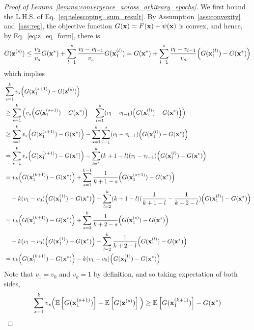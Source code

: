 \begin{proof}[Proof of Lemma~\ref{lemma:convergence_across_arbitrary_epochs}]
    We first bound the L.H.S. of Eq.~\ref{eq:telescoping_sum_result}.
    By Assumption~\ref{ass:convexity} and~\ref{ass:reg}, the objective function $G({\mathbf{x}}) = F({\mathbf{x}}) + \psi({\mathbf{x}})$ is convex, and hence, by Eq.~\ref{eq:z_eq_form}, there is
    \begin{align}
        G({\mathbf{z}}^{(s)}) \leq \frac{v_0}{v_s} G({\mathbf{x}}^*) + \sum_{l=1}^{s}\frac{v_l - v_{l-1}}{v_s} G({\mathbf{x}}_1^{(l)})
        = G({\mathbf{x}}^*) + \sum_{l=1}^{s}\frac{v_l - v_{l-1}}{v_s} \Big( G({\mathbf{x}}_1^{(l)}) - G({\mathbf{x}}^*)\Big)
    \end{align}
    which implies
    \begin{align}
        &\sum_{s=1}^{k} v_s \Big( G({\mathbf{x}}_1^{(s+1)}) - G({\mathbf{z}}^{(s)})\Big)\\
        \nonumber
        &\geq \sum_{s=1}^{k} \Big( v_s \Big(G({\mathbf{x}}_1^{(s+1)}) - G({\mathbf{x}}^*)\Big) - \sum_{l=1}^{s} (v_l - v_{l-1}) \Big(G({\mathbf{x}}_1^{(l)}) - G({\mathbf{x}}^*)\Big) \Big)\\
        &\geq \sum_{s=1}^{k} v_s \Big(G({\mathbf{x}}_1^{(s+1)}) - G({\mathbf{x}}^*)\Big)
        - \sum_{s=1}^{k}\sum_{l=1}^{s} (v_l - v_{l-1}) \Big(G({\mathbf{x}}_1^{(l)}) - G({\mathbf{x}}^*)\Big)\\
        &= \sum_{s=1}^{k} v_s \Big(G({\mathbf{x}}_1^{(s+1)}) - G({\mathbf{x}}^*)\Big)
        - \sum_{l=1}^{k}(k+1-l) (v_l - v_{l-1}) \Big(G({\mathbf{x}}_1^{(l)}) - G({\mathbf{x}}^*)\Big)\\
        &= v_k \Big( G({\mathbf{x}}_1^{(k+1)}) - G({\mathbf{x}}^*) \Big)
        + \sum_{s=1}^{k-1} \frac{1}{k+1-s} \Big(G({\mathbf{x}}_1^{(s+1)}) - G({\mathbf{x}}^*)\Big)\\
        \nonumber
        &\quad - k(v_1 - v_0)\Big( G({\mathbf{x}}_1^{(1)}) - G({\mathbf{x}}^*) \Big)
        - \sum_{l=2}^{k}(k+1-l)(\frac{1}{k+1-l} - \frac{1}{k+2-l})\Big(G({\mathbf{x}}_1^{(l)}) - G({\mathbf{x}}^*)\Big)\\
        &= v_k \Big( G({\mathbf{x}}_1^{(k+1)}) - G({\mathbf{x}}^*) \Big)
        + \sum_{s=2}^{k} \frac{1}{k+2-s} \Big( G({\mathbf{x}}_1^{(s)}) - G({\mathbf{x}}^*) \Big)\\
        \nonumber
        &\quad - k(v_1 - v_0) \Big( G({\mathbf{x}}_1^{(1)}) - G({\mathbf{x}}^*)\Big)
        - \sum_{l=2}^{k}\frac{1}{k+2-l}\Big(G({\mathbf{x}}_1^{(l)}) - G({\mathbf{x}}^*)\Big)\\
        &= v_k \Big( G({\mathbf{x}}_1^{(k+1)}) - G({\mathbf{x}}^*) \Big) - k(v_1 - v_0)\Big( G({\mathbf{x}}_1^{(1)}) - G({\mathbf{x}}^*)\Big)
    \end{align}
    Note that $v_1 = v_0$ and $v_k = 1$ by definition, and so taking expectation of both sides,
    \begin{align}
    \label{eq:convergence_across_arbitrary_epochs_lhs}
        \sum_{s=1}^{k} v_s\Big( \mathbb{E}\left[G({\mathbf{x}}_1^{(s+1)}) \right] - \mathbb{E}\left[G({\mathbf{z}}^{(s)})\right]\Big)
        \geq \mathbb{E}\left[G({\mathbf{x}}_1^{(k+1)})\right] - G({\mathbf{x}}^*)
    \end{align}


\end{proof}
